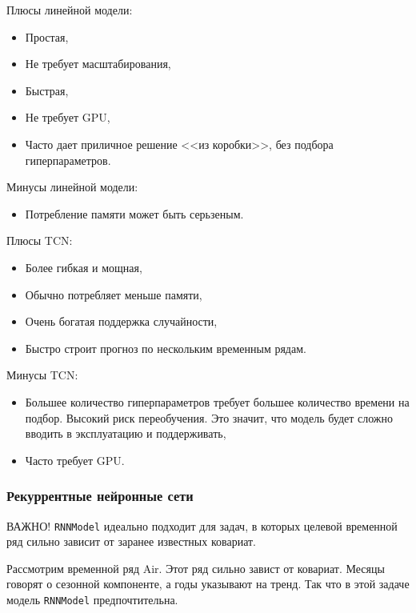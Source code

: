 \documentclass[%
	11pt,
	a4paper,
	utf8,
		]{article}
\begin{document}
Плюсы линейной модели:
\begin{itemize}
	\item Простая,
	
	\item Не требует масштабирования,
	
	\item Быстрая,
	
	\item Не требует GPU,
	
    \item Часто дает приличное решение <<из коробки>>, без подбора гиперпараметров.
\end{itemize}

Минусы линейной модели:
\begin{itemize}
	\item Потребление памяти может быть серьзеным.
\end{itemize}

Плюсы TCN:
\begin{itemize}
	\item Более гибкая и мощная,
	
	\item Обычно потребляет меньше памяти,
	
	\item Очень богатая поддержка случайности,
	
	\item Быстро строит прогноз по нескольким временным рядам.
\end{itemize}

Минусы TCN:
\begin{itemize}
	\item Большее количество гиперпараметров требует большее количество времени на подбор. Высокий риск переобучения. Это значит, что модель будет сложно вводить в эксплуатацию и поддерживать,
	
	\item Часто требует GPU.
\end{itemize}

\subsubsection{Рекуррентные нейронные сети}

{\color{blue}ВАЖНО! \verb|RNNModel| идеально подходит для задач, в которых целевой временной ряд сильно зависит от заранее известных ковариат.}

Рассмотрим временной ряд Air. Этот ряд сильно завист от ковариат. Месяцы говорят о сезонной компоненте, а годы указывают на тренд. Так что в этой задаче модель \verb|RNNModel| предпочтительна.
\end{document}
